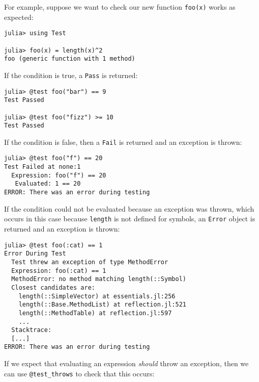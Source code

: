 For example, suppose we want to check our new function \texttt{foo(x)} works as expected:




\begin{verbatim}
julia> using Test

julia> foo(x) = length(x)^2
foo (generic function with 1 method)
\end{verbatim}



If the condition is true, a \texttt{Pass} is returned:




\begin{verbatim}
julia> @test foo("bar") == 9
Test Passed

julia> @test foo("fizz") >= 10
Test Passed
\end{verbatim}



If the condition is false, then a \texttt{Fail} is returned and an exception is thrown:




\begin{verbatim}
julia> @test foo("f") == 20
Test Failed at none:1
  Expression: foo("f") == 20
   Evaluated: 1 == 20
ERROR: There was an error during testing
\end{verbatim}



If the condition could not be evaluated because an exception was thrown, which occurs in this case because \texttt{length} is not defined for symbols, an \texttt{Error} object is returned and an exception is thrown:




\begin{verbatim}
julia> @test foo(:cat) == 1
Error During Test
  Test threw an exception of type MethodError
  Expression: foo(:cat) == 1
  MethodError: no method matching length(::Symbol)
  Closest candidates are:
    length(::SimpleVector) at essentials.jl:256
    length(::Base.MethodList) at reflection.jl:521
    length(::MethodTable) at reflection.jl:597
    ...
  Stacktrace:
  [...]
ERROR: There was an error during testing
\end{verbatim}



If we expect that evaluating an expression \emph{should} throw an exception, then we can use \texttt{@test\_throws} to check that this occurs:




